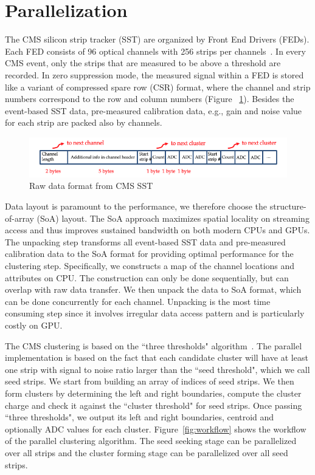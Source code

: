 \documentclass[10pt, paper=a4, UKenglish]{article}
\begin{document}
\section{Parallelization}
\label{para}
The CMS silicon strip tracker (SST) are organized by Front End Drivers (FEDs). Each FED consists of 96 optical channels with 256 strips per channels~\cite{CMSTWiki}. In every CMS event, only the strips that are measured to be above a threshold are recorded. In zero suppression mode, the measured signal within a FED is stored like a variant of compressed spare row (CSR) format, where the channel and strip numbers correspond to the row and column numbers (Figure ~\ref{fig:SSTlayout}). Besides the event-based SST data, pre-measured calibration data, e.g., gain and noise value for each strip are packed also by channels. 

\begin{figure}[!htb]
  \centering
  \includegraphics[scale=0.5]{SSTlayout}
  \caption{Raw data format from CMS SST}
  \label{fig:SSTlayout}
\end{figure}

Data layout is paramount to the performance, we therefore choose the structure-of-array (SoA) layout. The SoA approach maximizes spatial locality on streaming access and thus improves sustained bandwidth on both modern CPUs and GPUs. The unpacking step transforms all event-based SST data and pre-measured calibration data to the SoA format for providing optimal performance for the clustering step. Specifically, we constructs a map of the channel locations and attributes on CPU. The construction can only be done sequentially, but can overlap with raw data transfer. We then unpack the data to SoA format, which can be done concurrently for each channel. Unpacking is the most time consuming step since it involves irregular data access pattern and is particularly costly on GPU. 

The CMS clustering is based on the ``three thresholds" algorithm~\cite{CMSTWiki}. The parallel implementation is based on the fact that each candidate cluster will have at least one strip with signal to noise ratio larger than the ``seed threshold", which we call seed strips. We start from building an array of indices of seed strips. We then form clusters by determining the left and right boundaries, compute the cluster charge and check it against the ``cluster threshold" for seed strips. Once passing ``three thresholds", we output its left and right boundaries, centroid and optionally ADC values for each cluster. Figure~\ref{fig:workflow} shows the workflow of the parallel clustering algorithm. The seed seeking stage can be parallelized over all strips and the cluster forming stage can be parallelized over all seed strips. 
\end{document}
